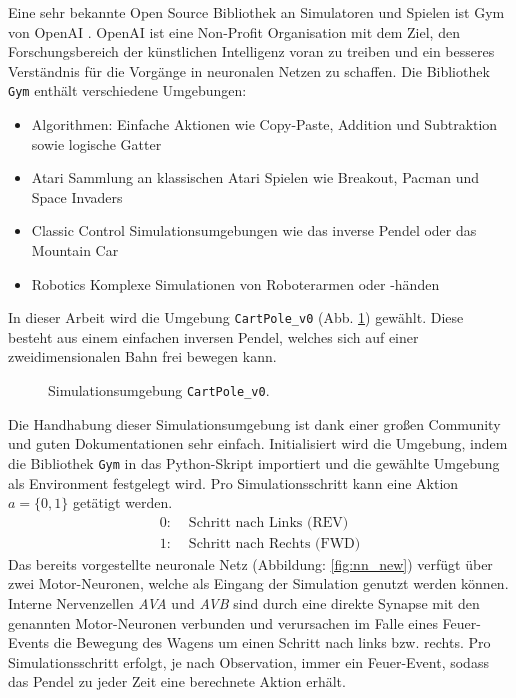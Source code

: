 	Eine sehr bekannte Open Source Bibliothek an Simulatoren und Spielen ist Gym von OpenAI \cite{Brockman2016}. OpenAI ist eine Non-Profit Organisation mit dem Ziel, den Forschungsbereich der künstlichen Intelligenz voran zu treiben und ein besseres Verständnis für die Vorgänge in neuronalen Netzen zu schaffen. Die Bibliothek \texttt{Gym} enthält verschiedene Umgebungen:
	\begin{itemize}
		\item Algorithmen:
		\subitem Einfache Aktionen wie Copy-Paste, Addition und Subtraktion sowie logische Gatter
		\item Atari
		\subitem Sammlung an klassischen Atari Spielen wie Breakout, Pacman und Space Invaders
		\item Classic Control
		\subitem Simulationsumgebungen wie das inverse Pendel oder das Mountain Car
		\item Robotics
		\subitem Komplexe Simulationen von Roboterarmen oder -händen
	\end{itemize}
	In dieser Arbeit wird die Umgebung \texttt{CartPole\_v0} (Abb. \ref{fig:imp_cartpole}) gewählt. Diese besteht aus einem einfachen inversen Pendel, welches sich auf einer zweidimensionalen Bahn frei bewegen kann.
	\begin{figure}[H]
		\centering
		\def\svgwidth{12cm}
		
		\caption{Simulationsumgebung \texttt{CartPole\_v0}.}
		\label{fig:imp_cartpole}
	\end{figure}
	Die Handhabung dieser Simulationsumgebung ist dank einer großen Community und guten Dokumentationen sehr einfach. Initialisiert wird die Umgebung, indem die Bibliothek \texttt{Gym} in das Python-Skript importiert und die gewählte Umgebung als \glqq Environment\grqq{} festgelegt wird. Pro Simulationsschritt kann eine Aktion $a = \{0,1\}$ getätigt werden.
	\begin{align*}
		0 :& \text{ Schritt nach Links (REV)}\\
		1 :& \text{ Schritt nach Rechts (FWD)}
	\end{align*}
	Das bereits vorgestellte neuronale Netz (Abbildung: \ref{fig:nn_new}) verfügt über zwei Motor-Neuronen, welche als Eingang der Simulation genutzt werden können. Interne Nervenzellen \textit{AVA} und \textit{AVB} sind durch eine direkte Synapse mit den genannten Motor-Neuronen verbunden und verursachen im Falle eines Feuer-Events die Bewegung des Wagens um einen Schritt nach links bzw. rechts. Pro Simulationsschritt erfolgt, je nach Observation, immer ein Feuer-Event, sodass das Pendel zu jeder Zeit eine berechnete Aktion erhält.
